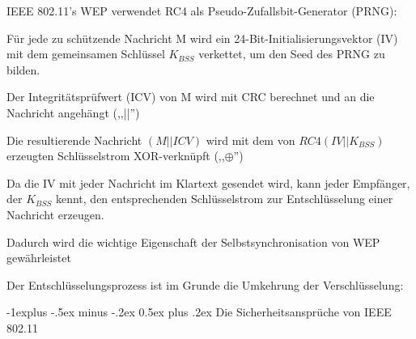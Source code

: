 \documentclass[a4paper]{article}
\makeatletter
\renewcommand{\subsection}{\@startsection{subsection}{2}{0mm}%
 {-1explus -.5ex minus -.2ex}%
 {0.5ex plus .2ex}%
 {\normalfont\normalsize\bfseries}}
\makeatother
\begin{document}
\begin{multicols}{3}
      \begin{itemize*}
            \item IEEE 802.11's WEP verwendet RC4 als Pseudo-Zufallsbit-Generator
            (PRNG):
            \begin{itemize*}
                  \item Für jede zu schützende Nachricht M wird ein 24-Bit-Initialisierungsvektor (IV) mit dem gemeinsamen Schlüssel $K_{BSS}$ verkettet, um den Seed des PRNG zu bilden.
                  \item Der Integritätsprüfwert (ICV) von M wird mit CRC berechnet und an die Nachricht angehängt (,,||'')
                  \item Die resultierende Nachricht $(M || ICV)$ wird mit dem von $RC4(IV || K_{BSS})$ erzeugten Schlüsselstrom XOR-verknüpft (,,$\oplus$'')
            \end{itemize*}
            \item Da die IV mit jeder Nachricht im Klartext gesendet wird, kann jeder
            Empfänger, der $K_{BSS}$ kennt, den entsprechenden Schlüsselstrom
            zur Entschlüsselung einer Nachricht erzeugen.
            \begin{itemize*}
                  \item Dadurch wird die wichtige Eigenschaft der Selbstsynchronisation von WEP gewährleistet
                  \item Der Entschlüsselungsprozess ist im Grunde die Umkehrung der Verschlüsselung:
            \end{itemize*}
      \end{itemize*}


      \subsection{Die Sicherheitsansprüche von IEEE
            802.11}


\end{multicols}
\end{document}
